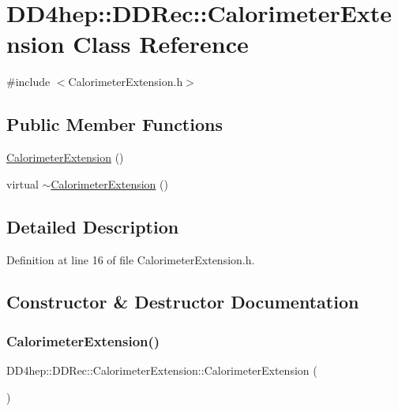 \hypertarget{class_d_d4hep_1_1_d_d_rec_1_1_calorimeter_extension}{}\section{D\+D4hep\+:\+:D\+D\+Rec\+:\+:Calorimeter\+Extension Class Reference}
\label{class_d_d4hep_1_1_d_d_rec_1_1_calorimeter_extension}


{\ttfamily \#include $<$Calorimeter\+Extension.\+h$>$}

\subsection*{Public Member Functions}
\begin{DoxyCompactItemize}
\item 
\hyperlink{class_d_d4hep_1_1_d_d_rec_1_1_calorimeter_extension_a825366de862b94c746fe49432591406b}{Calorimeter\+Extension} ()
\item 
virtual \hyperlink{class_d_d4hep_1_1_d_d_rec_1_1_calorimeter_extension_a387851f2812749225010c8e3d174724f}{$\sim$\+Calorimeter\+Extension} ()
\end{DoxyCompactItemize}


\subsection{Detailed Description}


Definition at line 16 of file Calorimeter\+Extension.\+h.



\subsection{Constructor \& Destructor Documentation}
\hypertarget{class_d_d4hep_1_1_d_d_rec_1_1_calorimeter_extension_a825366de862b94c746fe49432591406b}{}\label{class_d_d4hep_1_1_d_d_rec_1_1_calorimeter_extension_a825366de862b94c746fe49432591406b} 
\subsubsection{\texorpdfstring{Calorimeter\+Extension()}{CalorimeterExtension()}}
{\footnotesize\ttfamily D\+D4hep\+::\+D\+D\+Rec\+::\+Calorimeter\+Extension\+::\+Calorimeter\+Extension (\begin{DoxyParamCaption}{ }\end{DoxyParamCaption})}

